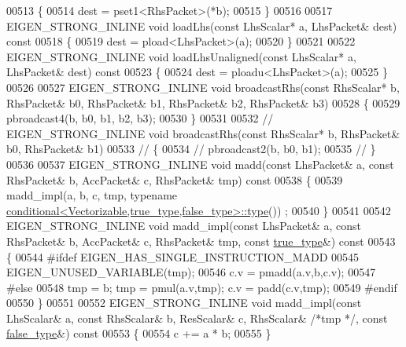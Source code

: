 \begin{DoxyCode}
00513 \textcolor{keyword}{  }\{
00514     dest = pset1<RhsPacket>(*b);
00515   \}
00516 
00517   EIGEN\_STRONG\_INLINE \textcolor{keywordtype}{void} loadLhs(\textcolor{keyword}{const} LhsScalar* a, LhsPacket& dest)\textcolor{keyword}{ const}
00518 \textcolor{keyword}{  }\{
00519     dest = pload<LhsPacket>(a);
00520   \}
00521 
00522   EIGEN\_STRONG\_INLINE \textcolor{keywordtype}{void} loadLhsUnaligned(\textcolor{keyword}{const} LhsScalar* a, LhsPacket& dest)\textcolor{keyword}{ const}
00523 \textcolor{keyword}{  }\{
00524     dest = ploadu<LhsPacket>(a);
00525   \}
00526 
00527   EIGEN\_STRONG\_INLINE \textcolor{keywordtype}{void} broadcastRhs(\textcolor{keyword}{const} RhsScalar* b, RhsPacket& b0, RhsPacket& b1, RhsPacket& b2, 
      RhsPacket& b3)
00528   \{
00529     pbroadcast4(b, b0, b1, b2, b3);
00530   \}
00531   
00532 \textcolor{comment}{//   EIGEN\_STRONG\_INLINE void broadcastRhs(const RhsScalar* b, RhsPacket& b0, RhsPacket& b1)}
00533 \textcolor{comment}{//   \{}
00534 \textcolor{comment}{//     pbroadcast2(b, b0, b1);}
00535 \textcolor{comment}{//   \}}
00536 
00537   EIGEN\_STRONG\_INLINE \textcolor{keywordtype}{void} madd(\textcolor{keyword}{const} LhsPacket& a, \textcolor{keyword}{const} RhsPacket& b, AccPacket& c, RhsPacket& tmp)\textcolor{keyword}{ const}
00538 \textcolor{keyword}{  }\{
00539     madd\_impl(a, b, c, tmp, \textcolor{keyword}{typename} 
      \hyperlink{class_eigen_1_1internal_1_1_tensor_lazy_evaluator_writable}{conditional<Vectorizable,true\_type,false\_type>::type}())
      ;
00540   \}
00541 
00542   EIGEN\_STRONG\_INLINE \textcolor{keywordtype}{void} madd\_impl(\textcolor{keyword}{const} LhsPacket& a, \textcolor{keyword}{const} RhsPacket& b, AccPacket& c, RhsPacket& tmp, \textcolor{keyword}{
      const} \hyperlink{struct_eigen_1_1internal_1_1true__type}{true\_type}&)\textcolor{keyword}{ const}
00543 \textcolor{keyword}{  }\{
00544 \textcolor{preprocessor}{#ifdef EIGEN\_HAS\_SINGLE\_INSTRUCTION\_MADD}
00545     EIGEN\_UNUSED\_VARIABLE(tmp);
00546     c.v = pmadd(a.v,b,c.v);
00547 \textcolor{preprocessor}{#else}
00548     tmp = b; tmp = pmul(a.v,tmp); c.v = padd(c.v,tmp);
00549 \textcolor{preprocessor}{#endif}
00550   \}
00551 
00552   EIGEN\_STRONG\_INLINE \textcolor{keywordtype}{void} madd\_impl(\textcolor{keyword}{const} LhsScalar& a, \textcolor{keyword}{const} RhsScalar& b, ResScalar& c, RhsScalar& \textcolor{comment}{/*tmp
      */}, \textcolor{keyword}{const} \hyperlink{struct_eigen_1_1internal_1_1false__type}{false\_type}&)\textcolor{keyword}{ const}
00553 \textcolor{keyword}{  }\{
00554     c += a * b;
00555   \}

\end{DoxyCode}
